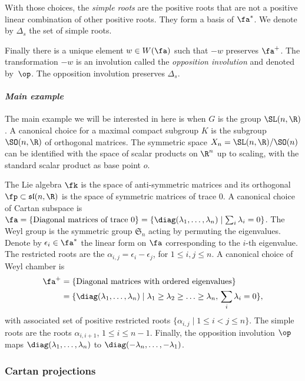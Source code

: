 With those choices, the \emph{simple roots} are the positive roots that are not a positive linear combination of other positive roots. They form a basis of $\fa^*$. We denote by $\Delta_s$ the set of simple roots.

Finally there is a unique element $w\in W(\fa)$ such that $-w$ preserves $\fa^+$. The transformation $-w$ is an involution called the \emph{opposition involution} and denoted by~$\op$. The opposition involution preserves $\Delta_s$.

\paragraph{\textit{Main example}} The main example we will be interested in here is when $G$ is the group $\SL(n,\R)$. A canonical choice for a maximal compact subgroup $K$ is the subgroup $\SO(n,\R)$ of orthogonal matrices. The symmetric space $X_n = \SL(n,\R)/\SO(n)$ can be identified with the space of scalar products on $\R^n$ up to scaling, with the standard scalar product as base point $o$.

The Lie algebra $\fk$ is the space of anti-symmetric matrices and its orthogonal $\fp \subset \mathfrak{sl}(n,\R)$ is the space of symmetric matrices of trace $0$. A canonical choice of Cartan subspace is $\fa= \{\textrm{Diagonal matrices of trace $0$}\}= \{ \diag(\lambda_1, \dots , \lambda_n)\mid \sum_i \lambda_i=0\} $. The Weyl group is the symmetric group $\mathfrak{S}_n$ acting by permuting the eigenvalues. Denote by $\epsilon_i\in \fa^*$ the linear form on $\fa$ corresponding to the $i$-th eigenvalue. The restricted roots are the $\alpha_{i,j}=\epsilon_i - \epsilon_j$, for $1\leq i, j \leq n$. A canonical choice of Weyl chamber is
\begin{align*}
\fa^+ &=\{\textrm{Diagonal matrices with ordered eigenvalues}\}\\
&=\{ \diag(\lambda_1, \dots , \lambda_n)\mid \lambda_1 \geq \lambda_2\geq \ldots \geq \lambda_n, \, \sum_i \lambda_i=0\},
\end{align*}
with associated set of positive restricted roots $\{\alpha_{i,j}\mid 1\leq i < j \leq n\}$. The simple roots are the roots $\alpha_{i,i+1}$, $1\leq i \leq n-1$. Finally, the opposition involution $\op$ maps $\diag(\lambda_1,\ldots, \lambda_n)$ to $\diag(-\lambda_n,\ldots, -\lambda_1)$.

\subsubsection{Cartan projections}

